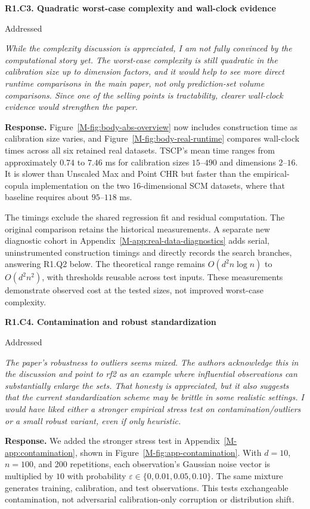 \documentclass[11pt]{article}
\newcommand{\msapp}[1]{Appendix~\ref*{M-#1}}
\newcommand{\msfig}[1]{Figure~\ref*{M-#1}}
\newcommand{\point}[3]{\par\Needspace{7\baselineskip}\medskip
\noindent\parbox[t]{0.77\linewidth}{\textbf{#1}}\hfill
\parbox[t]{0.21\linewidth}{\raggedleft\small\sffamily #2}\par\nopagebreak
{\color{ReviewerBlue}\small\itshape #3\par}\textbf{Response.} }
\begin{document}
\point{R1.C3. Quadratic worst-case complexity and wall-clock evidence}{Addressed}{While the complexity discussion is appreciated, I am not fully convinced
by the computational story yet. The worst-case complexity is still
quadratic in the calibration size up to dimension factors, and it would
help to see more direct runtime comparisons in the main paper, not only
prediction-set volume comparisons. Since one of the selling points is
tractability, clearer wall-clock evidence would strengthen the paper.}
\label{response:R1.C3}
\msfig{fig:body-abs-overview} now includes construction time as calibration size varies, and \msfig{fig:body-real-runtime} compares wall-clock times across all six retained real datasets. TSCP's mean time ranges from approximately $0.74$ to $7.46$ ms for calibration sizes $15$--$490$ and dimensions $2$--$16$. It is slower than Unscaled Max and Point CHR but faster than the empirical-copula implementation on the two 16-dimensional SCM datasets, where that baseline requires about $95$--$118$ ms.

The timings exclude the shared regression fit and residual computation. The original comparison retains the historical measurements. A separate new diagnostic cohort in \msapp{app:real-data-diagnostics} adds serial, uninstrumented construction timings and directly records the search branches, answering R1.Q2 below. The theoretical range remains $O(d^2n\log n)$ to $O(d^2n^2)$, with thresholds reusable across test inputs. These measurements demonstrate observed cost at the tested sizes, not improved worst-case complexity.

\point{R1.C4. Contamination and robust standardization}{Addressed}{The paper's robustness to outliers seems mixed. The authors acknowledge
this in the discussion and point to rf2 as an example where influential
observations can substantially enlarge the sets. That honesty is
appreciated, but it also suggests that the current standardization
scheme may be brittle in some realistic settings. I would have liked
either a stronger empirical stress test on contamination/outliers or a
small robust variant, even if only heuristic.}
\label{response:R1.C4}
We added the stronger stress test in \msapp{app:contamination}, shown in \msfig{fig:app-contamination}. With $d=10$, $n=100$, and 200 repetitions, each observation's Gaussian noise vector is multiplied by $10$ with probability $\varepsilon\in\{0,0.01,0.05,0.10\}$. The same mixture generates training, calibration, and test observations. This tests exchangeable contamination, not adversarial calibration-only corruption or distribution shift.
\end{document}
